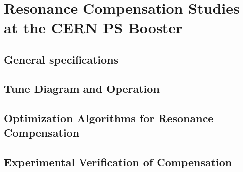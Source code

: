\chapter{Resonance Compensation Studies at the CERN PS Booster}
\label{sec:ch4}

\section{General specifications}

\section{Tune Diagram and Operation}

\section{Optimization Algorithms for Resonance Compensation}

\section{Experimental Verification of Compensation}
